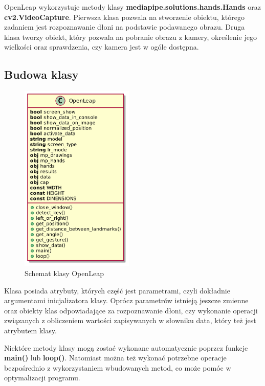 \quad OpenLeap wykorzystuje metody klasy \textbf{mediapipe.solutions.hands.Hands} oraz \textbf{cv2.VideoCapture}. Pierwsza klasa pozwala na stworzenie obiektu, którego zadaniem jest rozpoznawanie dłoni na podstawie podawanego obrazu. Druga klasa tworzy obiekt, który pozwala na pobranie obrazu z kamery, określenie jego wielkości oraz sprawdzenia, czy kamera jest w ogóle dostępna. 

\newpage
\subsection{Budowa klasy}

\begin{figure}
    \begin{center}
        \includegraphics[width=0.48\textwidth]{../images/class.png}
        \end{center}
    \caption{Schemat klasy OpenLeap}
\end{figure}

\quad Klasa posiada atrybuty, których część jest parametrami, czyli dokładnie argumentami inicjalizatora klasy. Oprócz parametrów istnieją jeszcze zmienne oraz obiekty klas odpowiadające za rozpoznawanie dłoni, czy wykonanie operacji związanych z obliczeniem wartości zapisywanych w słowniku data, który też jest atrybutem klasy.

\quad Niektóre metody klasy mogą zostać wykonane automatycznie poprzez funkcje \textbf{main()} lub \textbf{loop()}. Natomiast można też wykonać potrzebne operacje bezpośrednio z wykorzystaniem wbudowanych metod, co może pomóc w optymalizacji programu. \newline\newline\newline\newline\newline\newline

